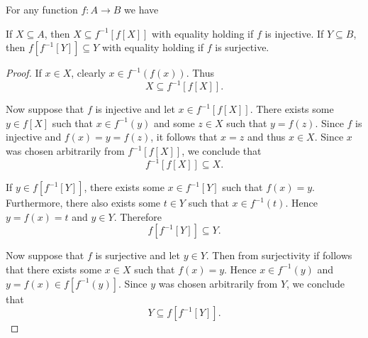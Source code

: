 \begin{proposition}\label{thm:function_image_preimage_composition}
  For any function \( f: A \to B \) we have
  \begin{thmenum}
     If \( X \subseteq A \), then \( X \subseteq f^{-1}[f[X]] \) with equality holding if \( f \) is injective.
     If \( Y \subseteq B \), then \( f[f^{-1}[Y]] \subseteq Y \) with equality holding if \( f \) is surjective.
  \end{thmenum}
\end{proposition}
\begin{proof}
   If \( x \in X \), clearly \( x \in f^{-1}(f(x)) \). Thus
  \begin{equation*}
    X \subseteq f^{-1}[f[X]].
  \end{equation*}

  Now suppose that \( f \) is injective and let \( x \in f^{-1}[f[X]] \). There exists some \( y \in f[X] \) such that \( x \in f^{-1}(y) \) and some \( z \in X \) such that \( y = f(z) \). Since \( f \) is injective and \( f(x) = y = f(z) \), it follows that \( x = z \) and thus \( x \in X \). Since \( x \) was chosen arbitrarily from \( f^{-1}[f[X]] \), we conclude that
  \begin{equation*}
    f^{-1}[f[X]] \subseteq X.
  \end{equation*}

   If \( y \in f[f^{-1}[Y]] \), there exists some \( x \in f^{-1}[Y] \) such that \( f(x) = y \). Furthermore, there also exists some \( t \in Y \) such that \( x \in f^{-1}(t) \). Hence \( y = f(x) = t \) and \( y \in Y \). Therefore
  \begin{equation*}
    f[f^{-1}[Y]] \subseteq Y.
  \end{equation*}

  Now suppose that \( f \) is surjective and let \( y \in Y \). Then from surjectivity if follows that there exists some \( x \in X \) such that \( f(x) = y \). Hence \( x \in f^{-1}(y) \) and \( y = f(x) \in f[f^{-1}(y)] \). Since \( y \) was chosen arbitrarily from \( Y \), we conclude that
  \begin{equation*}
    Y \subseteq f[f^{-1}[Y]].
  \end{equation*}
\end{proof}

